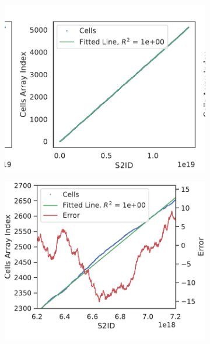 \begin{figure}[H]
        \centering
  \begin{subfigure}[t]{.30\linewidth}
    \centering\includegraphics[clip,trim=0.9cm 0cm 0.5cm 0cm,width=\linewidth]{chapter_3_polylidar3d/imgs/ga_linear_interp_1.pdf}
    \caption{\label{fig:ch3_linear_interp_1}}
  \end{subfigure}
\quad \quad
  \begin{subfigure}[t]{.33\linewidth}
    \centering
    \includegraphics[width=\linewidth]{chapter_3_polylidar3d/imgs/ga_linear_interp_2.pdf}

\end{subfigure}
\end{figure}
